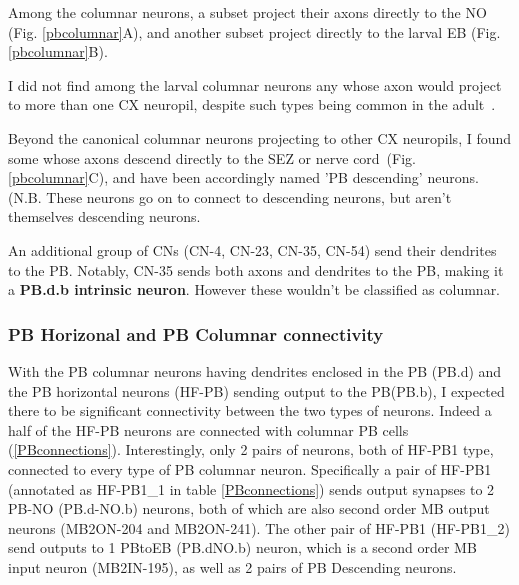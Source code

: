     Among the columnar neurons, a subset project their axons directly to the NO (Fig. \ref{pbcolumnar}A), and another subset project directly to the larval EB (Fig. \ref{pbcolumnar}B). 

    I did not find among the larval columnar neurons any whose axon would project to more than one CX neuropil, despite such types being common in the adult~\citep{wolff2015neuroarchitecture, wolff2018neuroarchitecture, hulse2021connectome}.

    Beyond the canonical columnar neurons projecting to other CX neuropils, I found some whose axons descend directly to the SEZ or nerve cord~(Fig. \ref{pbcolumnar}C), and have been accordingly named 'PB descending' neurons. (N.B. These neurons go on to connect to descending neurons, but aren't themselves descending neurons.

    An additional group of CNs (CN-4, CN-23, CN-35, CN-54) send their dendrites to the PB. Notably, CN-35 sends both axons and dendrites to the PB, making it a \textbf{PB.d.b intrinsic neuron}. However these wouldn't be classified as columnar. 

    \subsubsection{PB Horizonal and PB Columnar connectivity}
    With the PB columnar neurons having dendrites enclosed in the PB (PB.d) and the PB horizontal neurons (HF-PB) sending output to the PB(PB.b), I expected there to be significant connectivity between the two types of neurons. Indeed a half of the HF-PB neurons are connected with columnar PB cells (\ref{PBconnections}).  Interestingly, only 2 pairs of neurons, both of HF-PB1 type, connected to every type of PB columnar neuron. Specifically a pair of HF-PB1 (annotated as HF-PB1\_1 in table \ref{PBconnections}) sends output synapses to 2 PB-NO (PB.d-NO.b) neurons, both of which are also second order MB output neurons (MB2ON-204 and MB2ON-241). The other pair of  HF-PB1 (HF-PB1\_2) send outputs to 1 PBtoEB (PB.dNO.b) neuron, which is a second order MB input neuron (MB2IN-195), as well as 2 pairs of PB Descending neurons. 


